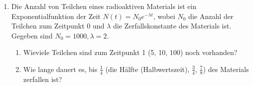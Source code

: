 \begin{enumerate}
  \item Die Anzahl von Teilchen eines radioaktiven Materials ist ein
Exponentialfunktion der Zeit $N(t) = N_0e^{-\lambda t}$, wobei $N_0$ die
Anzahl der Teilchen zum Zeitpunkt 0 und $\lambda$ die Zerfallskonstante des
Materials ist. Gegeben sind $N_0= 1000, \lambda = 2$.
\begin{enumerate}
  \item Wieviele Teilchen sind zum Zeitpunkt 1 (5, 10, 100) noch vorhanden?
  \item Wie lange dauert es, bis $\frac{1}{4}$ (die Hälfte (Halbwertszeit),
$\frac{3}{4}$, $\frac{7}{8}$) des Materials zerfallen ist?
\end{enumerate}

\end{enumerate}




